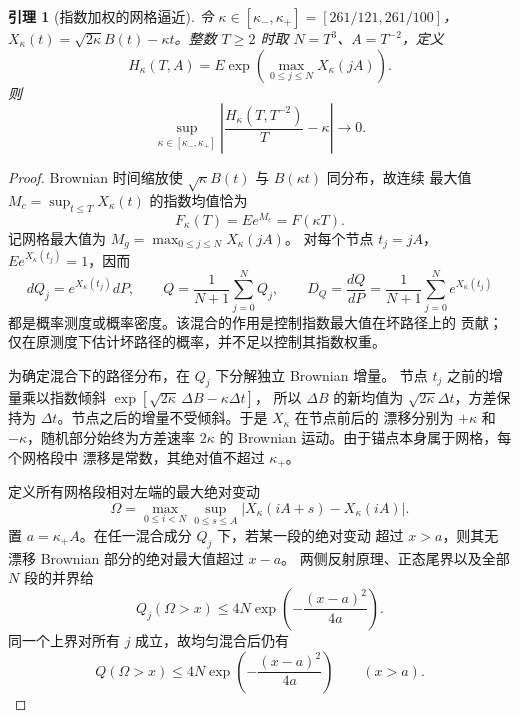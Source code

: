 \documentclass[UTF8,a4paper,11pt,fontset=fandol]{ctexart}
\newtheorem{lemma}{引理}[section]
\theoremstyle{remark}
\begin{document}
\begin{lemma}[指数加权的网格逼近]\label{lem:papermesh}
令 $\kappa\in[\kappa_-,\kappa_+]=[261/121,261/100]$，
$X_\kappa(t)=\sqrt{2\kappa}B(t)-\kappa t$。整数 $T\ge2$ 时取
$N=T^3$、$A=T^{-2}$，定义
\[
 H_\kappa(T,A)=E\exp\!\left(\max_{0\le j\le N}X_\kappa(jA)\right).
\]
则
\[
 \sup_{\kappa\in[\kappa_-,\kappa_+]}
 \left|\frac{H_\kappa(T,T^{-2})}{T}-\kappa\right|\longrightarrow0.
\]
\end{lemma}
\begin{proof}
Brownian 时间缩放使 $\sqrt{\kappa}B(t)$ 与 $B(\kappa t)$ 同分布，故连续
最大值 $M_c=\sup_{t\le T}X_\kappa(t)$ 的指数均值恰为
\[
 F_\kappa(T)=Ee^{M_c}=F(\kappa T).
\]
记网格最大值为 $M_g=\max_{0\le j\le N}X_\kappa(jA)$。
对每个节点 $t_j=jA$，$Ee^{X_\kappa(t_j)}=1$，因而
\[
 dQ_j=e^{X_\kappa(t_j)}dP,
 \qquad Q=\frac1{N+1}\sum_{j=0}^NQ_j,
 \qquad D_Q=\frac{dQ}{dP}
 =\frac1{N+1}\sum_{j=0}^Ne^{X_\kappa(t_j)}
\]
都是概率测度或概率密度。该混合的作用是控制指数最大值在坏路径上的
贡献；仅在原测度下估计坏路径的概率，并不足以控制其指数权重。

为确定混合下的路径分布，在 $Q_j$ 下分解独立 Brownian 增量。
节点 $t_j$ 之前的增量乘以指数倾斜
\(\exp[\sqrt{2\kappa}\,\Delta B-\kappa\Delta t]\)，
所以 $\Delta B$ 的新均值为 $\sqrt{2\kappa}\Delta t$，方差保持为
$\Delta t$。节点之后的增量不受倾斜。于是 $X_\kappa$ 在节点前后的
漂移分别为 $+\kappa$ 和 $-\kappa$，随机部分始终为方差速率
$2\kappa$ 的 Brownian 运动。由于锚点本身属于网格，每个网格段中
漂移是常数，其绝对值不超过 $\kappa_+$。

定义所有网格段相对左端的最大绝对变动
\[
 \Omega=\max_{0\le i<N}\sup_{0\le s\le A}
 |X_\kappa(iA+s)-X_\kappa(iA)|.
\]
置 $a=\kappa_+A$。在任一混合成分 $Q_j$ 下，若某一段的绝对变动
超过 $x>a$，则其无漂移 Brownian 部分的绝对最大值超过 $x-a$。
两侧反射原理、正态尾界以及全部 $N$ 段的并界给
\[
 Q_j(\Omega>x)\le4N\exp\!\left(-\frac{(x-a)^2}{4a}\right).
\]
同一个上界对所有 $j$ 成立，故均匀混合后仍有
\begin{equation}\label{eq:paperomegatail}
 Q(\Omega>x)\le4N\exp\!\left(-\frac{(x-a)^2}{4a}\right)
 \qquad(x>a).
\end{equation}


\end{proof}
\end{document}
